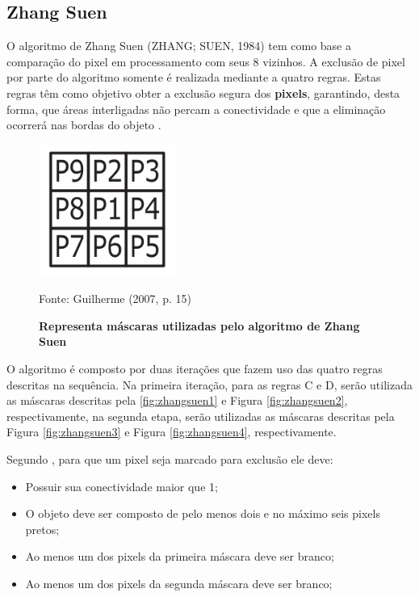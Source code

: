 \documentclass[
	12pt,				%
	oneside,			%
	a4paper,			%
	english,			%
	french,				%
	spanish,			%
	brazil,				%
	]{abntex2}
\begin{document}
\subsection{Zhang Suen}

O algoritmo de Zhang Suen (ZHANG; SUEN, 1984) tem como base a comparação do pixel em processamento com seus 8 vizinhos. A exclusão de pixel por parte do algoritmo somente é realizada mediante a quatro regras. Estas regras têm como objetivo obter a exclusão segura dos \textbf{pixels}, garantindo, desta forma, que áreas interligadas não percam a conectividade e que a eliminação ocorrerá nas bordas do objeto \cite{guilherme:2007}.

\begin{figure}[ht]
\centering
\caption{\textbf{Representa máscaras utilizadas pelo algoritmo de Zhang Suen}}
\includegraphics[width=0.4\textwidth]{imagens/zhangsuen_mascara.png}

Fonte: Guilherme (2007, p. 15)
\label{fig:zhangsuen_mascara}
\end{figure}

O algoritmo é composto por duas iterações que fazem uso das quatro regras descritas na sequência. Na primeira iteração, para as regras C e D, serão utilizada as máscaras descritas pela \ref{fig:zhangsuen1} e Figura \ref{fig:zhangsuen2}, respectivamente, na segunda etapa, serão utilizadas as máscaras descritas pela Figura \ref{fig:zhangsuen3} e Figura \ref{fig:zhangsuen4}, respectivamente.

Segundo \citet{guilherme:2007}, para que um pixel seja marcado para exclusão ele deve:

\begin{itemize}
\item Possuir sua conectividade maior que 1;
\item O objeto deve ser composto de pelo menos dois e no máximo seis pixels pretos;
\item Ao menos um dos pixels da primeira máscara deve ser branco;
\item Ao menos um dos pixels da segunda máscara deve ser branco;
\end{itemize}
\end{document}
